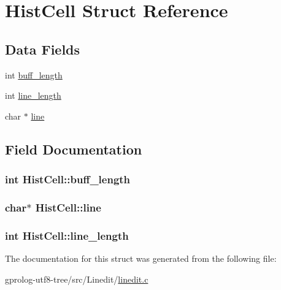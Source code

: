 \hypertarget{structHistCell}{}\section{Hist\+Cell Struct Reference}
\label{structHistCell}
\subsection*{Data Fields}
\begin{DoxyCompactItemize}
\item 
int \hyperlink{structHistCell_a969bc82748a2a5ec09f62d138f62d206}{buff\+\_\+length}
\item 
int \hyperlink{structHistCell_aab32370dee81b023aa2d04e3c6a148e4}{line\+\_\+length}
\item 
char $\ast$ \hyperlink{structHistCell_a7c9560a76c886d7c26f118668303945a}{line}
\end{DoxyCompactItemize}


\subsection{Field Documentation}
\subsubsection[{\texorpdfstring{buff\+\_\+length}{buff_length}}]{\setlength{\rightskip}{0pt plus 5cm}int Hist\+Cell\+::buff\+\_\+length}\hypertarget{structHistCell_a969bc82748a2a5ec09f62d138f62d206}{}\label{structHistCell_a969bc82748a2a5ec09f62d138f62d206}
\subsubsection[{\texorpdfstring{line}{line}}]{\setlength{\rightskip}{0pt plus 5cm}char$\ast$ Hist\+Cell\+::line}\hypertarget{structHistCell_a7c9560a76c886d7c26f118668303945a}{}\label{structHistCell_a7c9560a76c886d7c26f118668303945a}
\subsubsection[{\texorpdfstring{line\+\_\+length}{line_length}}]{\setlength{\rightskip}{0pt plus 5cm}int Hist\+Cell\+::line\+\_\+length}\hypertarget{structHistCell_aab32370dee81b023aa2d04e3c6a148e4}{}\label{structHistCell_aab32370dee81b023aa2d04e3c6a148e4}


The documentation for this struct was generated from the following file\+:\begin{DoxyCompactItemize}
\item 
gprolog-\/utf8-\/tree/src/\+Linedit/\hyperlink{linedit_8c}{linedit.\+c}\end{DoxyCompactItemize}
